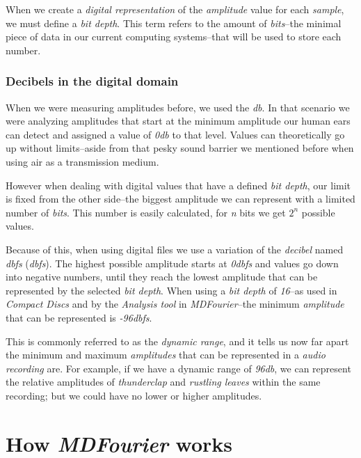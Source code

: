 \documentclass[10pt,a4paper]{report}
\newcommand{\define}[1]{\textit{\acrlong{#1}} (\textit{\acrshort{#1}})}
\newcommand{\ac}[1]{\textit{\acrshort{#1}}}
\newcommand{\db}[1]{\textit{#1\acrshort{dbfs}}}
\begin{document}
When we create a \textit{digital representation} of the \textit{amplitude} value for each \textit{sample}, we must define a \textit{bit depth}. This term refers to the amount of \textit{bits}--the minimal piece of data in our current computing systems--that will be used to store each number.

\subsection{Decibels in the digital domain}

When we were measuring amplitudes before, we used the \ac{db}. In that scenario we were analyzing amplitudes that start at the minimum amplitude our human ears can detect and assigned a value of \textit{0\acrshort{db}} to that level. Values can theoretically go up without limits--aside from that pesky sound barrier we mentioned before when using air as a transmission medium.

However when dealing with digital values that have a defined \textit{bit depth}, our limit is fixed from the other side--the biggest amplitude we can represent with a limited number of \textit{bits}. This number is easily calculated, for \textit{n} bits we get $2^n$ possible values.

Because of this, when using digital files we use a variation of the \textit{decibel} named \define{dbfs}. The highest possible amplitude starts at \db{0} and values go down into negative numbers, until they reach the lowest amplitude that can be represented by the selected \textit{bit depth}. When using a \textit{bit depth} of \textit{16}--as used in \textit{Compact Discs} and by the \textit{Analysis tool} in \textit{MDFourier}--the minimum \textit{amplitude} that can be represented is \db{-96}.

This is commonly referred to as the \textit{dynamic range}, and it tells us now far apart the minimum and maximum \textit{amplitudes} that can be represented in a \textit{audio recording} are. For example, if we have a dynamic range of \textit{96\acrshort{db}}, we can represent the relative amplitudes of \textit{thunderclap} and \textit{rustling leaves} within the same recording; but we could have no lower or higher amplitudes.


\chapter{How \textit{MDFourier} works}
\label{howitworks}
\end{document}
